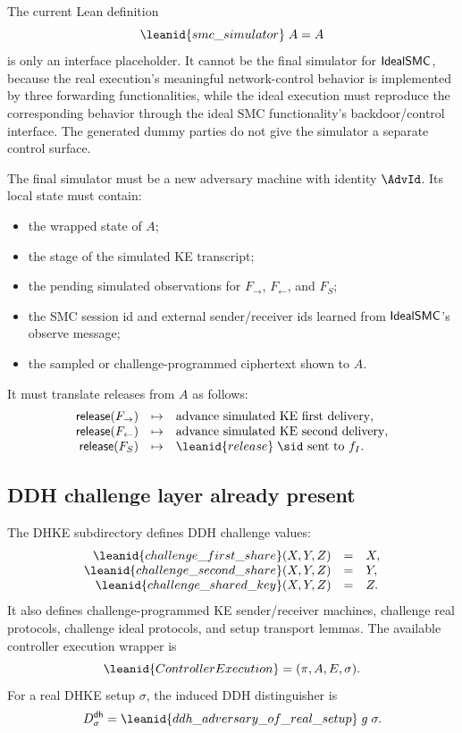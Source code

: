 \begin{obligation}
The current Lean definition
\[
  \leanid{smc\_simulator}\;A=A
\]
is only an interface placeholder.  It cannot be the final simulator for
\(\mathsf{IdealSMC}\), because the real execution's meaningful network-control
behavior is implemented by three forwarding functionalities, while the ideal
execution must reproduce the corresponding behavior through the ideal SMC
functionality's backdoor/control interface.  The generated dummy parties do not
give the simulator a separate control surface.

The final simulator must be a new adversary machine with identity \(\AdvId\).
Its local state must contain:
\begin{itemize}
\item the wrapped state of \(A\);
\item the stage of the simulated KE transcript;
\item the pending simulated observations for \(F_{\to}\), \(F_{\leftarrow}\),
and \(F_S\);
\item the SMC session id and external sender/receiver ids learned from
  \(\mathsf{IdealSMC}\)'s observe message;
\item the sampled or challenge-programmed ciphertext shown to \(A\).
\end{itemize}
It must translate releases from \(A\) as follows:
\[
\begin{array}{rcl}
\mathsf{release}(F_{\to})
  &\mapsto& \hbox{advance simulated KE first delivery},\\
\mathsf{release}(F_{\leftarrow})
  &\mapsto& \hbox{advance simulated KE second delivery},\\
\mathsf{release}(F_S)
  &\mapsto& \leanid{release}\;\sid
             \hbox{ sent to }f_I.
\end{array}
\]
\end{obligation}

\subsection{DDH challenge layer already present}

\begin{definition}
The DHKE subdirectory defines DDH challenge values:
\[
\begin{array}{rcl}
\leanid{challenge\_first\_share}(X,Y,Z)&=&X,\\
\leanid{challenge\_second\_share}(X,Y,Z)&=&Y,\\
\leanid{challenge\_shared\_key}(X,Y,Z)&=&Z.
\end{array}
\]
It also defines challenge-programmed KE sender/receiver machines, challenge
real protocols, challenge ideal protocols, and setup transport lemmas.  The
available controller execution wrapper is
\[
  \leanid{ControllerExecution}
    =(\pi,A,E,\sigma).
\]
For a real DHKE setup \(\sigma\), the induced DDH distinguisher is
\[
  D^{\mathsf{dh}}_{\sigma}
  =\leanid{ddh\_adversary\_of\_real\_setup}\;g\;\sigma .
\]
\end{definition}

